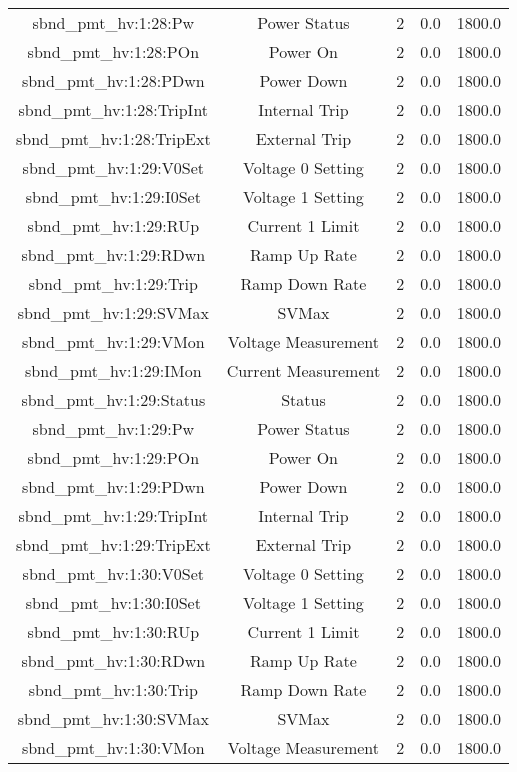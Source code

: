 \begin{center}
\begin{longtable}{c | c c c c }
sbnd\_pmt\_hv:1:28:Pw & Power Status & 2 & 0.0 & 1800.0\\ 
sbnd\_pmt\_hv:1:28:POn & Power On & 2 & 0.0 & 1800.0\\ 
sbnd\_pmt\_hv:1:28:PDwn & Power Down & 2 & 0.0 & 1800.0\\ 
sbnd\_pmt\_hv:1:28:TripInt & Internal Trip & 2 & 0.0 & 1800.0\\ 
sbnd\_pmt\_hv:1:28:TripExt & External Trip & 2 & 0.0 & 1800.0\\ 
sbnd\_pmt\_hv:1:29:V0Set & Voltage 0 Setting & 2 & 0.0 & 1800.0\\ 
sbnd\_pmt\_hv:1:29:I0Set & Voltage 1 Setting & 2 & 0.0 & 1800.0\\ 
sbnd\_pmt\_hv:1:29:RUp & Current 1 Limit & 2 & 0.0 & 1800.0\\ 
sbnd\_pmt\_hv:1:29:RDwn & Ramp Up Rate & 2 & 0.0 & 1800.0\\ 
sbnd\_pmt\_hv:1:29:Trip & Ramp Down Rate & 2 & 0.0 & 1800.0\\ 
sbnd\_pmt\_hv:1:29:SVMax & SVMax & 2 & 0.0 & 1800.0\\ 
sbnd\_pmt\_hv:1:29:VMon & Voltage Measurement & 2 & 0.0 & 1800.0\\ 
sbnd\_pmt\_hv:1:29:IMon & Current Measurement & 2 & 0.0 & 1800.0\\ 
sbnd\_pmt\_hv:1:29:Status & Status & 2 & 0.0 & 1800.0\\ 
sbnd\_pmt\_hv:1:29:Pw & Power Status & 2 & 0.0 & 1800.0\\ 
sbnd\_pmt\_hv:1:29:POn & Power On & 2 & 0.0 & 1800.0\\ 
sbnd\_pmt\_hv:1:29:PDwn & Power Down & 2 & 0.0 & 1800.0\\ 
sbnd\_pmt\_hv:1:29:TripInt & Internal Trip & 2 & 0.0 & 1800.0\\ 
sbnd\_pmt\_hv:1:29:TripExt & External Trip & 2 & 0.0 & 1800.0\\ 
sbnd\_pmt\_hv:1:30:V0Set & Voltage 0 Setting & 2 & 0.0 & 1800.0\\ 
sbnd\_pmt\_hv:1:30:I0Set & Voltage 1 Setting & 2 & 0.0 & 1800.0\\ 
sbnd\_pmt\_hv:1:30:RUp & Current 1 Limit & 2 & 0.0 & 1800.0\\ 
sbnd\_pmt\_hv:1:30:RDwn & Ramp Up Rate & 2 & 0.0 & 1800.0\\ 
sbnd\_pmt\_hv:1:30:Trip & Ramp Down Rate & 2 & 0.0 & 1800.0\\ 
sbnd\_pmt\_hv:1:30:SVMax & SVMax & 2 & 0.0 & 1800.0\\ 
sbnd\_pmt\_hv:1:30:VMon & Voltage Measurement & 2 & 0.0 & 1800.0\\ 

\end{longtable}
\end{center}
